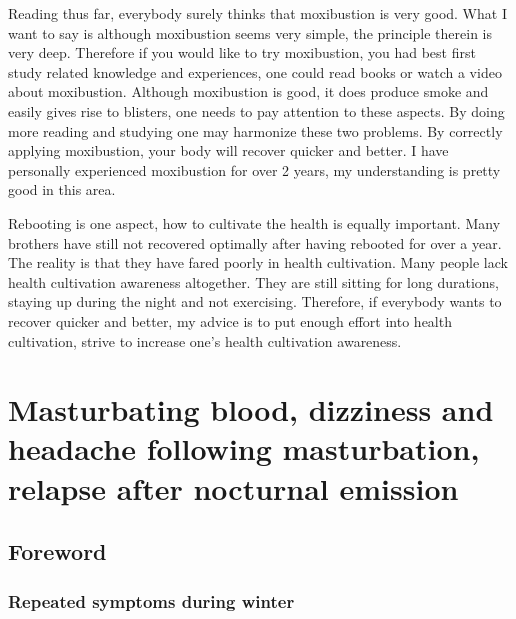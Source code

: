 \documentclass[
]{book}
\begin{document}
Reading thus far, everybody surely thinks that moxibustion is very good. What I want to say is although moxibustion seems very simple, the principle therein is very deep. Therefore if you would like to try moxibustion, you had best first study related knowledge and experiences, one could read books or watch a video about moxibustion. Although moxibustion is good, it does produce smoke and easily gives rise to blisters, one needs to pay attention to these aspects. By doing more reading and studying one may harmonize these two problems. By correctly applying moxibustion, your body will recover quicker and better. I have personally experienced moxibustion for over 2 years, my understanding is pretty good in this area.

Rebooting is one aspect, how to cultivate the health is equally important. Many brothers have still not recovered optimally after having rebooted for over a year. The reality is that they have fared poorly in health cultivation. Many people lack health cultivation awareness altogether. They are still sitting for long durations, staying up during the night and not exercising. Therefore, if everybody wants to recover quicker and better, my advice is to put enough effort into health cultivation, strive to increase one's health cultivation awareness.

\hypertarget{masturbating-blood-dizziness-and-headache-following-masturbation-relapse-after-nocturnal-emission}{%
\chapter{Masturbating blood, dizziness and headache following masturbation, relapse after nocturnal emission}\label{masturbating-blood-dizziness-and-headache-following-masturbation-relapse-after-nocturnal-emission}}

\hypertarget{foreword-11}{%
\section{Foreword}\label{foreword-11}}

\hypertarget{repeated-symptoms-during-winter}{%
\subsection{Repeated symptoms during winter}\label{repeated-symptoms-during-winter}}
\end{document}
